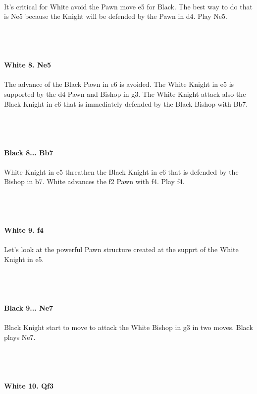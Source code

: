\documentclass{article}
\begin{document}
\\
It's critical for White avoid the Pawn move e5 for Black. The best way to do that is Ne5 because the Knight will be defended by the Pawn in d4. Play Ne5.\\\\
\\

\\
\\
\textbf{White 8. Ne5}\\
\\
The advance of the Black Pawn in e6 is avoided. The White Knight in e5 is supported by the d4 Pawn and Bishop in g3. The White Knight attack also the Black Knight in c6 that is immediately defended by the Black Bishop with Bb7.\\\\
\\

\\
\\
\textbf{Black 8... Bb7}\\
\\
White Knight in e5 threathen the Black Knight in c6 that is defended by the Bishop in b7. White advances the f2 Pawn with f4. Play f4.\\\\
\\

\\
\\
\textbf{White 9. f4}\\
\\
Let's look at the powerful Pawn structure created at the supprt of the White Knight in e5.\\\\
\\

\\
\\
\textbf{Black 9... Ne7}\\
\\
Black Knight start to move to attack the White Bishop in g3 in two moves. Black plays Ne7.\\\\
\\

\\
\\
\textbf{White 10. Qf3}\\
\end{document}
